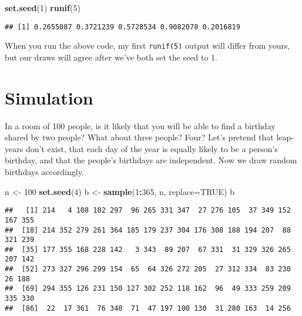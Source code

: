 \documentclass[]{book}
\newenvironment{Shaded}{\begin{snugshade}}{\end{snugshade}}
\newcommand{\DataTypeTok}[1]{\textcolor[rgb]{0.13,0.29,0.53}{#1}}
\newcommand{\DecValTok}[1]{\textcolor[rgb]{0.00,0.00,0.81}{#1}}
\newcommand{\KeywordTok}[1]{\textcolor[rgb]{0.13,0.29,0.53}{\textbf{#1}}}
\newcommand{\NormalTok}[1]{#1}
\newcommand{\OperatorTok}[1]{\textcolor[rgb]{0.81,0.36,0.00}{\textbf{#1}}}
\newcommand{\OtherTok}[1]{\textcolor[rgb]{0.56,0.35,0.01}{#1}}
\newcommand{\StringTok}[1]{\textcolor[rgb]{0.31,0.60,0.02}{#1}}
\theoremstyle{definition}
\theoremstyle{definition}
\theoremstyle{definition}
\theoremstyle{remark}
\begin{document}
\begin{Shaded}
\begin{Highlighting}[]
\KeywordTok{set.seed}\NormalTok{(}\DecValTok{1}\NormalTok{)}
\KeywordTok{runif}\NormalTok{(}\DecValTok{5}\NormalTok{)}
\end{Highlighting}
\end{Shaded}

\begin{verbatim}
## [1] 0.2655087 0.3721239 0.5728534 0.9082078 0.2016819
\end{verbatim}

When you run the above code, my first \texttt{runif(5)} output will
differ from yours, but our draws will agree after we've both set the
seed to 1.

\hypertarget{simulation}{%
\section{Simulation}\label{simulation}}

In a room of 100 people, is it likely that you will be able to find a
birthday shared by two people? What about three people? Four? Let's
pretend that leap-years don't exist, that each day of the year is
equally likely to be a person's birthday, and that the people's
birthdays are independent. Now we draw random birthdays accordingly.

\begin{Shaded}
\begin{Highlighting}[]
\NormalTok{n <-}\StringTok{ }\DecValTok{100}
\KeywordTok{set.seed}\NormalTok{(}\DecValTok{4}\NormalTok{)}
\NormalTok{b <-}\StringTok{ }\KeywordTok{sample}\NormalTok{(}\DecValTok{1}\OperatorTok{:}\DecValTok{365}\NormalTok{, n, }\DataTypeTok{replace=}\OtherTok{TRUE}\NormalTok{)}
\NormalTok{b}
\end{Highlighting}
\end{Shaded}

\begin{verbatim}
##   [1] 214   4 108 102 297  96 265 331 347  27 276 105  37 349 152 167 355
##  [18] 214 352 279 261 364 185 179 237 304 176 308 188 194 207  88 321 239
##  [35] 177 355 168 228 142   3 343  89 207  67 331  31 329 326 265 207 142
##  [52] 273 327 296 299 154  65  64 326 272 205  27 312 334  83 230  26 188
##  [69] 294 355 126 231 150 127 302 252 118 162  96  49 333 259 209 335 330
##  [86]  22  17 361  76 340  71  47 197 100 130  31 280 163  14 256
\end{verbatim}
\end{document}
